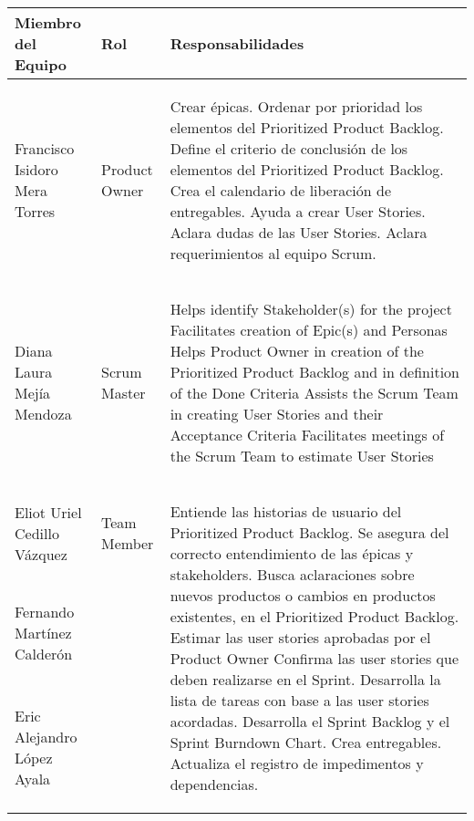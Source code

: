 \begin{center}
\begin{longtable}{|p{}|p{}|p{}|}
	\hline
		\rowcolor{principal}
		\bf \color{white} Miembro del Equipo & \bf \color{white} Rol & \bf \color{white} Responsabilidades\\
		\hline
		 Francisco Isidoro Mera Torres & Product Owner & \begin{Titemize}
		 	\Titem Crear épicas.
			\Titem Ordenar por prioridad los elementos del Prioritized Product Backlog.
		 	\Titem Define el criterio de conclusión de los elementos del Prioritized Product Backlog.
			\Titem Crea el calendario de liberación de entregables.
			\Titem Ayuda a crear User Stories.
			\Titem Aclara dudas de las User Stories.
			\Titem Aclara requerimientos al equipo Scrum.
		 \end{Titemize}\\\hline
		 Diana Laura Mejía Mendoza & Scrum Master & \begin{Titemize}
		 	\Titem Helps identify Stakeholder(s) for the project
			\Titem Facilitates creation of Epic(s) and Personas
			\Titem Helps Product Owner in creation of the Prioritized Product Backlog and in definition of the Done Criteria
			\Titem Assists the Scrum Team in creating User Stories and their Acceptance Criteria
			\Titem Facilitates meetings of the Scrum Team to estimate User Stories
		\end{Titemize}\\\hline
		 Eliot Uriel Cedillo Vázquez & Team Member & \multirow{4}{0.3\textwidth}{\begin{Titemize}
		 	\Titem Entiende las historias de usuario del Prioritized Product Backlog. 	
		 	\Titem Se asegura del correcto entendimiento de las épicas y stakeholders.
		 	\Titem Busca aclaraciones sobre nuevos productos o cambios en productos existentes, en el Prioritized Product Backlog.
		 	\Titem Estimar las user stories aprobadas por el Product Owner
		 	\Titem Confirma las user stories  que deben realizarse en el Sprint.
		 	\Titem Desarrolla la lista de tareas con base a las user stories acordadas.
		 	\Titem Desarrolla el Sprint Backlog y el Sprint Burndown Chart.
		 	\Titem Crea entregables.
		 	\Titem Actualiza el registro de impedimentos y dependencias.
		 \end{Titemize}}\\
		 Fernando Martínez Calderón &  & \\
		 Eric Alejandro López Ayala &  & \\

\end{longtable}
\end{center}

